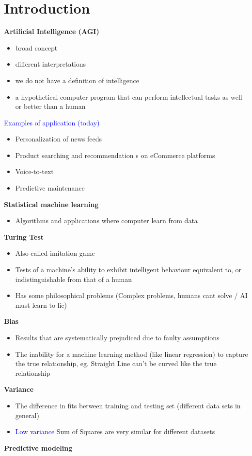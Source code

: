 
\section{Introduction}
\textbf{Artificial Intelligence (AGI)}
\begin{itemize}
    \item broad concept
    \item different interpretations
    \item we do not have a definition of intelligence
    \item a hypothetical computer program that can perform intellectual tasks as well or better than a human
\end{itemize}
\vspace{10pt}
\textcolor{blue}{Examples of application (today)}
\begin{itemize}
    \item Personalization of news feeds
    \item Product searching and recommendation s on eCommerce platforms
    \item Voice-to-text
    \item Predictive maintenance
\end{itemize}
\vspace{10pt}
\textbf{Statistical machine learning}
\begin{itemize}
    \item Algorithms and applications where computer learn from data
\end{itemize}
\vspace{10pt}
\textbf{Turing Test}
\begin{itemize}
    \item Also called imitation game
    \item Tests of a machine's ability to exhibit intelligent behaviour equivalent to, or indistinguishable from that of a human
    \item Has some philosophical problems (Complex problems, humans cant solve / AI must learn to lie)
\end{itemize}
\vspace{10pt}
\textbf{Bias}
\begin{itemize}
    \item Results that are systematically prejudiced due to faulty assumptions
    \item The inability for a machine learning method (like linear regression) to capture the true relationship, eg. Straight Line can't be curved like the true relationship
\end{itemize}
\vspace{10pt}
\textbf{Variance}
\begin{itemize}
    \item The difference in fits between training and testing set (different data sets in general)
    \item \textcolor{blue}{Low variance} Sum of Squares are very similar for different datasets
\end{itemize}
\vspace{10pt}
\textbf{Predictive modeling}

